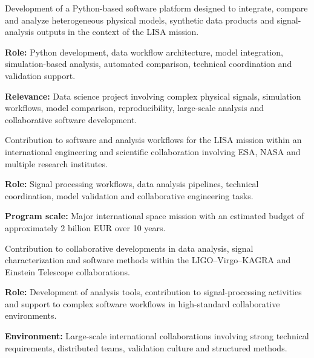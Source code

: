\documentclass[8pt,a4paper,ragged2e,withhyper]{altacv}
\begin{document}


Development of a Python-based software platform designed to integrate, compare and analyze heterogeneous physical models, synthetic data products and signal-analysis outputs in the context of the LISA mission.

\textbf{Role:} Python development, data workflow architecture, model integration, simulation-based analysis, automated comparison, technical coordination and validation support.

\textbf{Relevance:} Data science project involving complex physical signals, simulation workflows, model comparison, reproducibility, large-scale analysis and collaborative software development.

\divider


Contribution to software and analysis workflows for the LISA mission within an international engineering and scientific collaboration involving ESA, NASA and multiple research institutes.

\textbf{Role:} Signal processing workflows, data analysis pipelines, technical coordination, model validation and collaborative engineering tasks.

\textbf{Program scale:} Major international space mission with an estimated budget of approximately 2 billion EUR over 10 years.

\divider


Contribution to collaborative developments in data analysis, signal characterization and software methods within the LIGO--Virgo--KAGRA and Einstein Telescope collaborations.

\textbf{Role:} Development of analysis tools, contribution to signal-processing activities and support to complex software workflows in high-standard collaborative environments.

\textbf{Environment:} Large-scale international collaborations involving strong technical requirements, distributed teams, validation culture and structured methods.
\end{document}
